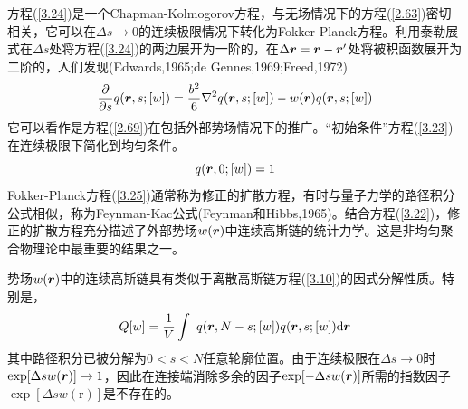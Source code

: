 方程(\ref{3.24})是一个Chapman-Kolmogorov方程，与无场情况下的方程(\ref{2.63})密切相关，它可以在$\Delta s\rightarrow 0$的连续极限情况下转化为Fokker-Planck方程。利用泰勒展式在$\Delta s$处将方程(\ref{3.24})的两边展开为一阶的，在$\Delta\bm{r}=\bm{r}-\bm{r}'$处将被积函数展开为二阶的，人们发现(Edwards,1965;de Gennes,1969;Freed,1972)
\begin{equation}\label{3.25}
\frac{\partial}{\partial s}q(\bm{r},s;[w])=\frac{b^2}{6}\nabla^2q(\bm{r},s;[w])-w(\bm{r})q(\bm{r},s;[w])
\end{equation}
它可以看作是方程(\ref{2.69})在包括外部势场情况下的推广。“初始条件”方程(\ref{3.23})在连续极限下简化到均匀条件。
\begin{equation}\label{3.26}
q(\bm{r},0;[w])=1
\end{equation}
Fokker-Planck方程(\ref{3.25})通常称为修正的扩散方程，有时与量子力学的路径积分公式相似，称为Feynman-Kac公式(Feynman和Hibbs,1965)。结合方程(\ref{3.22})，修正的扩散方程充分描述了外部势场$w(\bm{r})$中连续高斯链的统计力学。这是非均匀聚合物理论中最重要的结果之一。

势场$w(\bm{r})$中的连续高斯链具有类似于离散高斯链方程(\ref{3.10})的因式分解性质。特别是，
\begin{equation}\label{3.27}
Q[w]=\frac{1}{V}\int~q(\bm{r},N-s;[w])q(\bm{r},s;[w])\mathrm{d}\bm{r}
\end{equation}
其中路径积分已被分解为$0<s<N$任意轮廓位置。由于连续极限在$\Delta s\rightarrow 0$时$\exp[\Delta sw(\bm{r})]\rightarrow 1$，因此在连接端消除多余的因子$\exp[-\Delta sw(\bm{r})]$所需的指数因子$\exp[\Delta sw(\mathrm{r})]$是不存在的。

